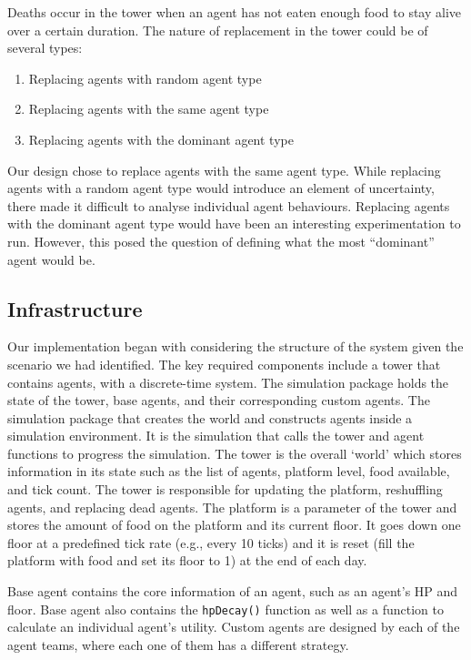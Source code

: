 Deaths occur in the tower when an agent has not eaten enough food to stay alive over a certain duration. The nature of replacement in the tower could be of several types:
\begin{enumerate}
    \item Replacing agents with random agent type
    \item Replacing agents with the same agent type
    \item Replacing agents with the dominant agent type
\end{enumerate}

Our design chose to replace agents with the same agent type. While replacing agents with a random agent type would introduce an element of uncertainty, there made it difficult to analyse individual agent behaviours. Replacing agents with the dominant agent type would have been an interesting experimentation to run. However, this posed the question of defining what the most “dominant” agent would be. 

\subsection{Infrastructure}

Our implementation began with considering the structure of the system given the scenario we had identified. The key required components include a tower that contains agents, with a discrete-time system.
The simulation package holds the state of the tower, base agents, and their corresponding custom agents. The simulation package that creates the world and constructs agents inside a simulation environment. It is the simulation that calls the tower and agent functions to progress the simulation.
The tower is the overall `world' which stores information in its state such as the list of agents, platform level, food available, and tick count. The tower is responsible for updating the platform, reshuffling agents, and replacing dead agents.
The platform is a parameter of the tower and stores the amount of food on the platform and its current floor. It goes down one floor at a predefined tick rate (e.g., every 10 ticks) and it is reset (fill the platform with food and set its floor to 1) at the end of each day.

Base agent contains the core information of an agent, such as an agent's HP and floor. Base agent also contains the \lstinline$hpDecay()$ function as well as a function to calculate an individual agent's utility. 
Custom agents are designed by each of the agent teams, where each one of them has a different strategy.

